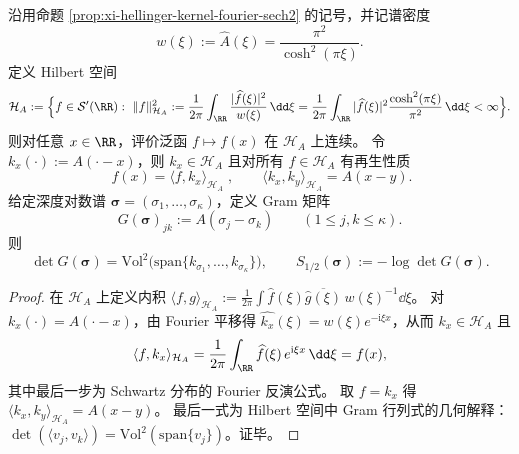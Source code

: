 \begin{proposition}\label{prop:xi-hellinger-kernel-rkhs-volume}
沿用命题 \ref{prop:xi-hellinger-kernel-fourier-sech2} 的记号，并记谱密度
\[
w(\xi):=\widehat A(\xi)=\frac{\pi^2}{\cosh^2(\pi\xi)}.
\]
定义 Hilbert 空间
\[
\mathcal H_{A}
:=\Bigl\{f\in\mathcal S'(\RR):\ \|f\|_{\mathcal H_A}^{2}
:=\frac{1}{2\pi}\int_{\RR}\frac{|\widehat f(\xi)|^{2}}{w(\xi)}\,\dd\xi
=\frac{1}{2\pi}\int_{\RR}|\widehat f(\xi)|^{2}\frac{\cosh^{2}(\pi\xi)}{\pi^{2}}\,\dd\xi<\infty\Bigr\}.
\]
则对任意 \(x\in\RR\)，评价泛函 \(f\mapsto f(x)\) 在 \(\mathcal H_A\) 上连续。
令 \(k_x(\cdot):=A(\cdot-x)\)，则 \(k_x\in\mathcal H_A\) 且对所有 \(f\in\mathcal H_A\) 有再生性质
\[
\boxed{\;f(x)=\langle f,k_x\rangle_{\mathcal H_A}\;},
\qquad
\langle k_x,k_y\rangle_{\mathcal H_A}=A(x-y).
\]
给定深度对数谱 \(\boldsymbol{\sigma}=(\sigma_1,\dots,\sigma_\kappa)\)，定义 Gram 矩阵
\[
G(\boldsymbol{\sigma})_{jk}:=A(\sigma_j-\sigma_k)\qquad(1\le j,k\le\kappa).
\]
则
\[
\boxed{\;
\det G(\boldsymbol{\sigma})
=\mathrm{Vol}^{2}\bigl(\mathrm{span}\{k_{\sigma_1},\dots,k_{\sigma_\kappa}\}\bigr),\qquad
S_{1/2}(\boldsymbol{\sigma}):=-\log\det G(\boldsymbol{\sigma}).\;}
\]
\end{proposition}
\begin{proof}
在 \(\mathcal H_A\) 上定义内积
\(
\langle f,g\rangle_{\mathcal H_A}:=\frac{1}{2\pi}\int \widehat f(\xi)\overline{\widehat g(\xi)}\,w(\xi)^{-1}\dd\xi
\)。
对 \(k_x(\cdot)=A(\cdot-x)\)，由 Fourier 平移得 \(\widehat{k_x}(\xi)=w(\xi)e^{-\mathrm{i}\xi x}\)，从而 \(k_x\in\mathcal H_A\) 且
\[
\langle f,k_x\rangle_{\mathcal H_A}
=\frac{1}{2\pi}\int_{\RR}\widehat f(\xi)\,e^{\mathrm{i}\xi x}\,\dd\xi
=f(x),
\]
其中最后一步为 Schwartz 分布的 Fourier 反演公式。
取 \(f=k_x\) 得 \(\langle k_x,k_y\rangle_{\mathcal H_A}=A(x-y)\)。
最后一式为 Hilbert 空间中 Gram 行列式的几何解释：\(\det(\langle v_j,v_k\rangle)=\mathrm{Vol}^{2}(\mathrm{span}\{v_j\})\)。证毕。
\end{proof}



